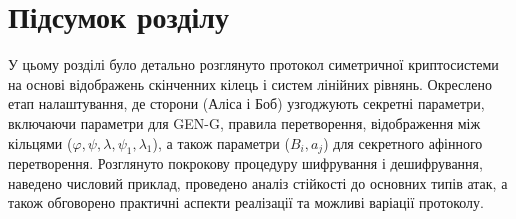 \section{Підсумок розділу}
\label{sec:chapter3_summary}
У цьому розділі було детально розглянуто протокол симетричної криптосистеми на основі відображень скінченних кілець і систем лінійних рівнянь.
Окреслено етап налаштування, де сторони (Аліса і Боб) узгоджують секретні параметри, включаючи параметри для GEN-G, правила перетворення, відображення між кільцями ($\varphi, \psi, \lambda, \psi_1, \lambda_1$), а також параметри ($B_i, a_j$) для секретного афінного перетворення.
Розглянуто покрокову процедуру шифрування і дешифрування, наведено числовий приклад, проведено аналіз стійкості до основних типів атак, а також обговорено практичні аспекти реалізації та можливі варіації протоколу.

